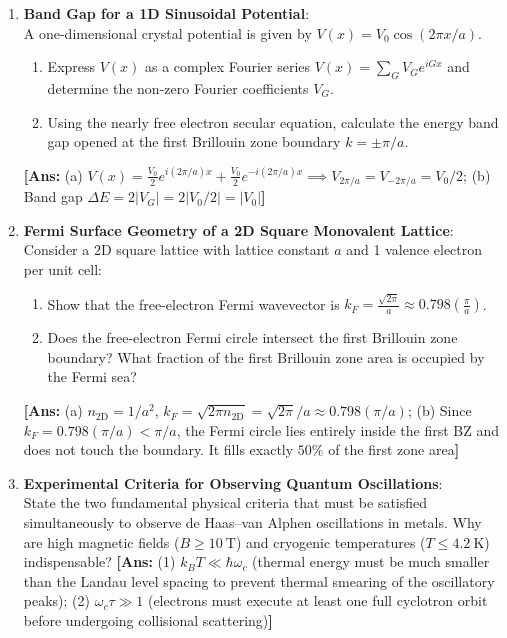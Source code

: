 \documentclass[11pt,a4paper]{article}
\begin{document}
\begin{enumerate}[label=\textbf{\arabic*.}, resume, leftmargin=*]
    \item \textbf{Band Gap for a 1D Sinusoidal Potential}:\\
    A one-dimensional crystal potential is given by $V(x) = V_0 \cos(2\pi x/a)$.
    \begin{enumerate}[label=(\alph*)]
        \item Express $V(x)$ as a complex Fourier series $V(x) = \sum_G V_G e^{i G x}$ and determine the non-zero Fourier coefficients $V_G$.
        \item Using the nearly free electron secular equation, calculate the energy band gap opened at the first Brillouin zone boundary $k = \pm \pi/a$.
    \end{enumerate}
    \textbf{[Ans:} (a) $V(x) = \frac{V_0}{2}e^{i(2\pi/a)x} + \frac{V_0}{2}e^{-i(2\pi/a)x} \implies V_{2\pi/a} = V_{-2\pi/a} = V_0/2$; (b) Band gap $\Delta E = 2|V_G| = 2|V_0/2| = |V_0|$\textbf{]}

    \item \textbf{Fermi Surface Geometry of a 2D Square Monovalent Lattice}:\\
    Consider a 2D square lattice with lattice constant $a$ and 1 valence electron per unit cell:
    \begin{enumerate}[label=(\alph*)]
        \item Show that the free-electron Fermi wavevector is $k_F = \frac{\sqrt{2\pi}}{a} \approx 0.798\left(\frac{\pi}{a}\right)$.
        \item Does the free-electron Fermi circle intersect the first Brillouin zone boundary? What fraction of the first Brillouin zone area is occupied by the Fermi sea?
    \end{enumerate}
    \textbf{[Ans:} (a) $n_{\mathrm{2D}} = 1/a^2$, $k_F = \sqrt{2\pi n_{\mathrm{2D}}} = \sqrt{2\pi}/a \approx 0.798(\pi/a)$; (b) Since $k_F = 0.798(\pi/a) < \pi/a$, the Fermi circle lies entirely inside the first BZ and does not touch the boundary. It fills exactly $50\%$ of the first zone area\textbf{]}

    \item \textbf{Experimental Criteria for Observing Quantum Oscillations}:\\
    State the two fundamental physical criteria that must be satisfied simultaneously to observe de Haas--van Alphen oscillations in metals. Why are high magnetic fields ($B \ge 10\ \mathrm{T}$) and cryogenic temperatures ($T \le 4.2\ \mathrm{K}$) indispensable?
    \textbf{[Ans:} (1) $k_B T \ll \hbar\omega_c$ (thermal energy must be much smaller than the Landau level spacing to prevent thermal smearing of the oscillatory peaks); (2) $\omega_c \tau \gg 1$ (electrons must execute at least one full cyclotron orbit before undergoing collisional scattering)\textbf{]}


\end{enumerate}
\end{document}
